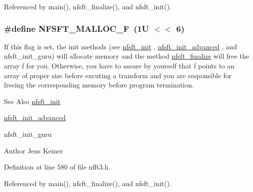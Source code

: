 Referenced by main(), nfsft\-\_\-finalize(), and nfsft\-\_\-init().

\hypertarget{group__nfsft_gaf3bc3ab774cda0c1c765e97066893d30}{
\subsubsection[{N\-F\-S\-F\-T\-\_\-\-M\-A\-L\-L\-O\-C\-\_\-\-F}]{\setlength{\rightskip}{0pt plus 5cm}\#define N\-F\-S\-F\-T\-\_\-\-M\-A\-L\-L\-O\-C\-\_\-\-F~(1\-U $<$$<$ 6)}}\label{group__nfsft_gaf3bc3ab774cda0c1c765e97066893d30}
If this flag is set, the init methods (see \hyperlink{group__nfsft_ga65cda3f4a3edc5eb39c697cf34b1f0b9}{nfsft\-\_\-init} , \hyperlink{group__nfsft_ga2812aa5beba0eb7efd3072bf323a0155}{nfsft\-\_\-init\-\_\-advanced} , and nfsft\-\_\-init\-\_\-guru) will allocate memory and the method \hyperlink{group__nfsft_gaa63e193a27d84059742ff25ff81e2ed1}{nfsft\-\_\-finalize} will free the array {\ttfamily f} for you. Otherwise, you have to assure by yourself that {\ttfamily f} points to an array of proper size before excuting a transform and you are responsible for freeing the corresponding memory before program termination.

\begin{DoxySeeAlso}{See Also}
\hyperlink{group__nfsft_ga65cda3f4a3edc5eb39c697cf34b1f0b9}{nfsft\-\_\-init} 

\hyperlink{group__nfsft_ga2812aa5beba0eb7efd3072bf323a0155}{nfsft\-\_\-init\-\_\-advanced} 

nfsft\-\_\-init\-\_\-guru 
\end{DoxySeeAlso}
\begin{DoxyAuthor}{Author}
Jens Keiner 
\end{DoxyAuthor}


Definition at line 580 of file nfft3.\-h.



Referenced by main(), nfsft\-\_\-finalize(), and nfsft\-\_\-init().

